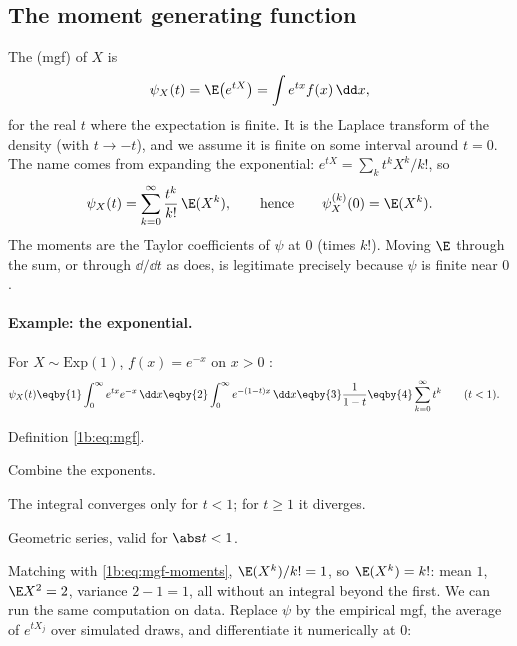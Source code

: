 \subsection{The moment generating function}

The  (mgf) of $X$ is
\begin{equation}
  \psi_X(t)=\E\bigl(e^{tX}\bigr)=\int e^{tx}f(x)\,\dd x ,
  \label{1b:eq:mgf}
\end{equation}
for the real $t$ where the expectation is finite. It is the Laplace transform
of the density (with $t\to-t$), and we assume it is finite on some interval
around $t=0$. The name comes from expanding the exponential:
$e^{tX}=\sum_k t^kX^k/k!$, so
\begin{equation}
  \psi_X(t)=\sum_{k=0}^{\infty}\frac{t^k}{k!}\,\E(X^k),
  \qquad\text{hence}\qquad
  \psi_X^{(k)}(0)=\E(X^k) .
  \label{1b:eq:mgf-moments}
\end{equation}
The moments are the Taylor coefficients of $\psi$ at $0$ (times $k!$). Moving
$\E$ through the sum, or through $\dd/\dd t$ as  does, is
legitimate precisely because $\psi$ is finite near $0$.

\paragraph{Example: the exponential.}
For $X\sim\mathrm{Exp}(1)$, $f(x)=e^{-x}$ on $x>0$ :
\begin{align*}
  \psi_X(t)
  &\eqby{1} \int_0^\infty e^{tx}e^{-x}\,\dd x
   \eqby{2} \int_0^\infty e^{-(1-t)x}\,\dd x
   \eqby{3} \frac{1}{1-t}
   \eqby{4} \sum_{k=0}^\infty t^k\qquad(t<1).
\end{align*}
\begin{explain}
  \item Definition \eqref{1b:eq:mgf}.
  \item Combine the exponents.
  \item The integral converges only for $t<1$; for $t\ge1$ it diverges.
  \item Geometric series, valid for $\abs t<1$.
\end{explain}
Matching with \eqref{1b:eq:mgf-moments}, $\E(X^k)/k!=1$, so $\E(X^k)=k!$: mean
$1$, $\E X^2=2$, variance $2-1=1$, all without an integral beyond the first.
We can run the same computation on data. Replace $\psi$ by the empirical mgf,
the average of $e^{tX_j}$ over simulated draws, and differentiate it
numerically at $0$:

